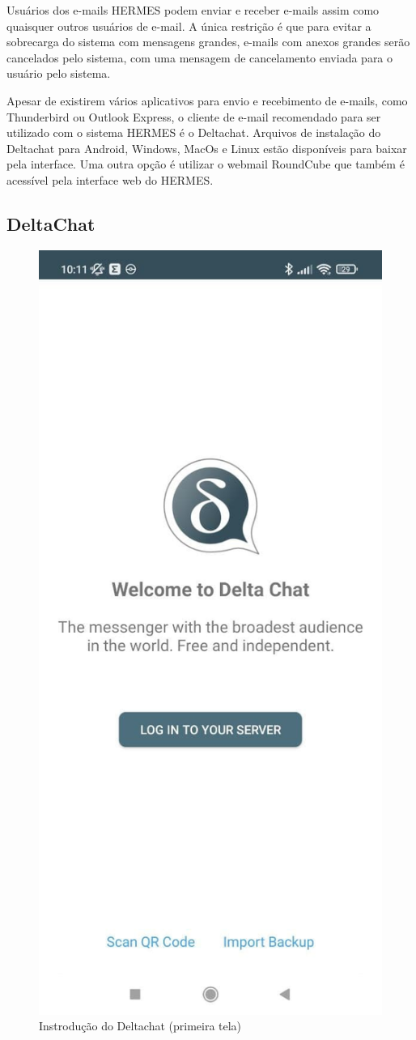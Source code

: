\documentclass[11pt,a4paper]{article}
\begin{document}
Usuários dos e-mails HERMES podem enviar e receber e-mails assim como quaisquer outros usuários de e-mail. A única restrição é que para evitar a sobrecarga do sistema com mensagens grandes, e-mails com anexos grandes serão cancelados pelo sistema, com uma mensagem de cancelamento enviada para o usuário pelo sistema.



Apesar de existirem vários aplicativos para envio e recebimento de e-mails, como Thunderbird ou Outlook Express, o cliente de e-mail recomendado para ser utilizado com o sistema HERMES é o Deltachat. Arquivos de instalação do Deltachat para Android, Windows, MacOs e Linux estão disponíveis para baixar pela interface. Uma outra opção é utilizar o webmail RoundCube que também é acessível pela interface web do HERMES.


\subsection{DeltaChat}

\begin{figure}[H]
    \centering
    \includegraphics[width=0.3\columnwidth]{screenshots/deltachat/en/intro.jpg}
    	\caption{Instrodução do Deltachat (primeira tela)}
	\vspace{-10pt}
    \label{fig:deltachat-intro}
\end{figure}
\end{document}
